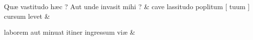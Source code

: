\documentclass[12pt,onecolumn,twoside,a4paper]{memoir}
\begin{document}
\begin{pairs}
\begin{Leftside}
                              Quæ
                              vastitudo
                              hæc
                              ?
                              Aut
                              unde
                              invasit
                              mihi
                              ? \&
                         \stanza {}
                     cave
                              lassitudo
                              poplitum
                              [
                              tuum
                              ]
                              cursum
                              levet \&
                         \stanza {}
                     
                              laborem
                              aut
                              minuat
                              itiner
                              ingressum
                              viæ \&
                     
                  \endnumbering
		\end{Leftside}
                  \begin{Rightside}
			\beginnumbering
			\numberstanzafalse
                     

\end{Rightside}
\end{pairs}
\end{document}
